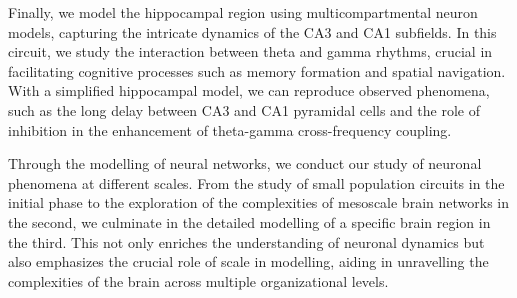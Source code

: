\documentclass[../main.tex]{subfiles}
\begin{document}
Finally, we model the hippocampal region using multicompartmental neuron models, capturing the intricate dynamics of the CA3 and CA1 subfields.
In this circuit, we study the interaction between theta and gamma rhythms, crucial in facilitating cognitive processes such as memory formation and spatial navigation.
With a simplified hippocampal model, we can reproduce observed phenomena, such as the long delay between CA3 and CA1 pyramidal cells and the role of inhibition in the enhancement of theta-gamma cross-frequency coupling.

Through the modelling of neural networks, we conduct our study of neuronal phenomena at different scales.
From the study of small population circuits in the initial phase to the exploration of the complexities of mesoscale brain networks in the second, we culminate in the detailed modelling of a specific brain region in the third.
This not only enriches the understanding of neuronal dynamics but also emphasizes the crucial role of scale in modelling, aiding in unravelling the complexities of the brain across multiple organizational levels.

\end{document}
